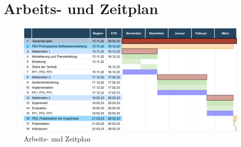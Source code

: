 \chapter{Arbeits- und Zeitplan}

\begin{figure}[h]
    \centering
    \includegraphics[width=\textwidth]{pictures/zeitplan.png}
    \caption{Arbeits- und Zeitplan}
    \label{fig:zeitplan}
\end{figure}

